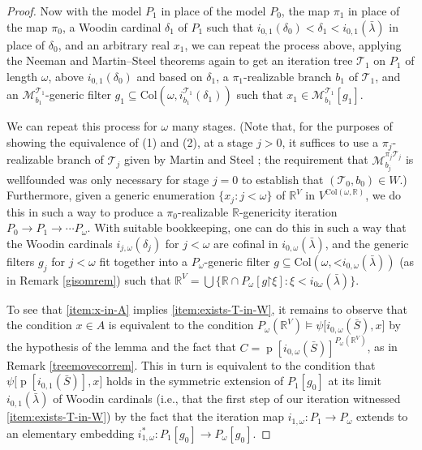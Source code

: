 \documentclass[fleqn, 11pt]{amsart}
\theoremstyle{plain}
\theoremstyle{definition}
\theoremstyle{remark}
\newcommand{\Col}{\mathrm{Col}}
\newcommand{\restrict}{\mathord{\restriction}}
\DeclareMathOperator{\p}{p}
\begin{document}
\begin{proof}
    
  
  Now with the model $P_1$ in place of the model $P_0$, the map $\pi_1$ in place of the map $\pi_0$,
  a Woodin cardinal $\delta_1$ of $P_1$ such that $i_{0,1}(\delta_0) < \delta_1 < i_{0,1}(\bar{\lambda})$ in place of $\delta_0$, and an arbitrary real $x_1$, we can repeat the process above, applying the Neeman and Martin--Steel theorems again
  to get an iteration tree $\mathcal{T}_1$ on $P_1$ of length $\omega$,
  above $i_{0,1}(\delta_0)$ and based on $\delta_1$, a $\pi_1$-realizable branch
  $b_1$ of $\mathcal{T}_1$, and an $\mathcal{M}^{\mathcal{T}_1}_{b_1}$-generic filter $g_1 \subseteq \Col(\omega, i^{\mathcal{T}_1}_{b_1}(\delta_1))$ such that 
  $x_1 \in \mathcal{M}^{\mathcal{T}_1}_{b_1}[g_1]$.
  
We can repeat this process for $\omega$ many stages.
(Note that, for the purposes of showing the equivalence of (1) and (2), at a stage $j>0$, it suffices to use a $\pi_j$-realizable branch of $\mathcal{T}_j$ given by Martin and Steel \cite[Theorem 3.12]{MarSteIterationTrees}; the requirement that $\mathcal{M}_{b_j}^{\pi_j\mathcal{T}_j}$ is wellfounded was only necessary for stage $j=0$ to establish that $(\mathcal{T}_{0}, b_{0})\in W$.)
  Furthermore, given a generic enumeration $\{x_j : j < \omega\}$ of $\mathbb{R}^V$ in $V^{\Col(\omega,\mathbb{R})}$, we do this in such a way to produce a 
  $\pi_0$-realizable $\mathbb{R}$-genericity iteration $P_0 \to P_1 \to \cdots P_\omega$.
  With suitable bookkeeping, one can do this in such a way that the Woodin cardinals $i_{j,\omega}(\delta_j)$ for $j<\omega$ are cofinal in $i_{0,\omega}(\bar{\lambda})$, and the generic filters
  $g_j$ for $j<\omega$ fit together into a $P_\omega$-generic
  filter $g \subseteq \Col(\omega,\mathord{<}i_{0,\omega}(\bar{\lambda}))$ (as in Remark \ref{gisomrem}) such that $\mathbb{R}^V = \bigcup\{\mathbb{R} \cap P_{\omega}[g \restrict \xi] : \xi < i_{0\omega}(\bar{\lambda})\}$.
   
To see that \eqref{item:x-in-A} implies \eqref{item:exists-T-in-W},
   it remains to observe that the condition $x \in A$ is equivalent to the condition $P_\omega(\mathbb{R}^V) \models \psi\big[i_{0,\omega}(\bar{S}),x\big]$ by the hypothesis of the lemma and the fact that $C = \p[i_{0,\omega}(\bar{S})]^{P_\omega(\mathbb{R}^V)}$, as in Remark \ref{treemovecorrem}. 
   This in turn is equivalent to the condition that $\psi\big[\p[i_{0,1}(\bar{S})],x\big]$ holds in the symmetric extension of $P_1[g_0]$ at its limit $i_{0,1}(\bar{\lambda})$ of Woodin cardinals (i.e., that the first step of our iteration witnessed \eqref{item:exists-T-in-W}) by the fact that the iteration map $i_{1,\omega} : P_1 \to P_\omega$ extends to an elementary embedding $i^*_{1,\omega} : P_1[g_0] \to P_\omega[g_0]$.
   

\end{proof}
\end{document}
